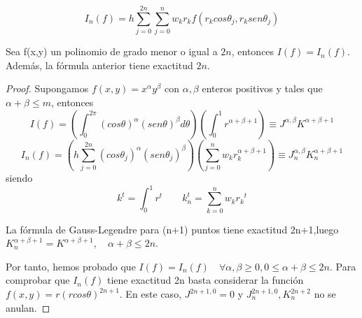 $$ I_n(f) = h\sum_{j=0}^{2n}\sum_{j=0}^{n} w_k r_k f(r_k cos\theta_j,r_ksen\theta_j)$$
\begin{thm}Sea f(x,y) un polinomio de grado menor o igual a $2n$, entonces $I(f)=I_n(f)$. Además, la fórmula anterior tiene exactitud $2n$. 
\end{thm}
\begin{proof}
	Supongamos $f(x,y)=x^\alpha y^\beta$ con  $\alpha,\beta$ enteros positivos y tales que  $\alpha+\beta \le m$, entonces
	$$
	I(f)=\left(\int_{0}^{2\pi}(cos\theta)^{\alpha}(sen\theta)^{\beta}d\theta\right)\left(\int_{0}^{1}r^{\alpha+\beta +1}\right) \equiv J^{\alpha,\beta}K^{ \alpha+\beta+1 }
	$$
	$$
	I_n(f) = \left(h\sum_{j=0}^{2n}(cos\theta_j)^{\alpha}(sen\theta_j)^{\beta}\right) \left(\sum_{j=0}^{n}w_kr_k^{\alpha+\beta+1}\right)\equiv J_n^{\alpha,\beta}K_n^{ \alpha+\beta+1 }
	$$
	siendo
	$$
	k^t = \int_{0}^{1 } r^t \qquad k_n^t=\sum_{k=0}^{n} w_k{r_k}^t
	$$
	
	
	La fórmula de Gauss-Legendre para (n+1) puntos tiene exactitud 2n+1,luego $K_n^{ \alpha+\beta+1 }=K^{ \alpha+\beta+1 }, \quad \alpha+\beta \le 2n$.
	\medskip
	
	Por tanto, hemos probado que $I(f) = I_n(f) \quad \forall \alpha,\beta\ge 0, 0\le\alpha+\beta \le 2n $.
	Para comprobar que $I_n(f)$ tiene exactitud 2n basta considerar la función $f(x,y) = r(rcos\theta)^{2n+1}$. En este caso, $J^{2n+1,0}=0$ y $J_n^{2n+1,0},K_n^{2n+2}$ no se anulan.
\end{proof}